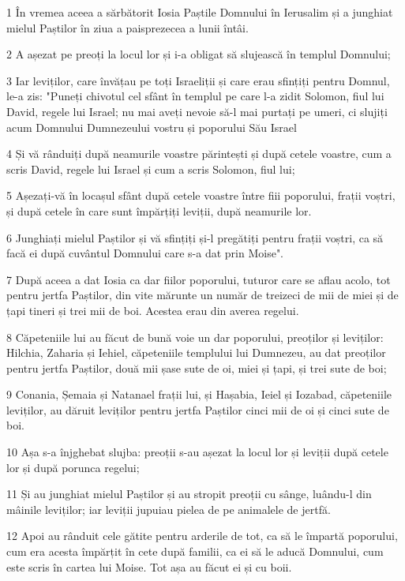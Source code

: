 \par 1 În vremea aceea a sărbătorit Iosia Paștile Domnului în Ierusalim și a junghiat mielul Paștilor în ziua a paisprezecea a lunii întâi.
\par 2 A așezat pe preoți la locul lor și i-a obligat să slujească în templul Domnului;
\par 3 Iar leviților, care învățau pe toți Israeliții și care erau sfințiți pentru Domnul, le-a zis: "Puneți chivotul cel sfânt în templul pe care l-a zidit Solomon, fiul lui David, regele lui Israel; nu mai aveți nevoie să-l mai purtați pe umeri, ci slujiți acum Domnului Dumnezeului vostru și poporului Său Israel
\par 4 Și vă rânduiți după neamurile voastre părintești și după cetele voastre, cum a scris David, regele lui Israel și cum a scris Solomon, fiul lui;
\par 5 Așezați-vă în locașul sfânt după cetele voastre între fiii poporului, frații voștri, și după cetele în care sunt împărțiți leviții, după neamurile lor.
\par 6 Junghiați mielul Paștilor și vă sfințiți și-l pregătiți pentru frații voștri, ca să facă ei după cuvântul Domnului care s-a dat prin Moise".
\par 7 După aceea a dat Iosia ca dar fiilor poporului, tuturor care se aflau acolo, tot pentru jertfa Paștilor, din vite mărunte un număr de treizeci de mii de miei și de țapi tineri și trei mii de boi. Acestea erau din averea regelui.
\par 8 Căpeteniile lui au făcut de bună voie un dar poporului, preoților și leviților: Hilchia, Zaharia și Iehiel, căpeteniile templului lui Dumnezeu, au dat preoților pentru jertfa Paștilor, două mii șase sute de oi, miei și țapi, și trei sute de boi;
\par 9 Conania, Șemaia și Natanael frații lui, și Hașabia, Ieiel și Iozabad, căpeteniile leviților, au dăruit leviților pentru jertfa Paștilor cinci mii de oi și cinci sute de boi.
\par 10 Așa s-a înjghebat slujba: preoții s-au așezat la locul lor și leviții după cetele lor și după porunca regelui;
\par 11 Și au junghiat mielul Paștilor și au stropit preoții cu sânge, luându-l din mâinile leviților; iar leviții jupuiau pielea de pe animalele de jertfă.
\par 12 Apoi au rânduit cele gătite pentru arderile de tot, ca să le împartă poporului, cum era acesta împărțit în cete după familii, ca ei să le aducă Domnului, cum este scris în cartea lui Moise. Tot așa au făcut ei și cu boii.

